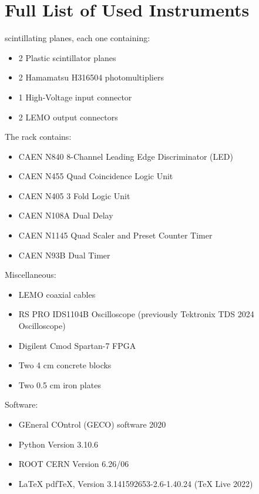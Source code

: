 \documentclass[../main.tex]{subfiles}
\begin{document}
\captionsetup{font=small}
\appendix
{} 

\section{Full List of Used Instruments}
\label{appendix:instruments}
 scintillating planes, each one containing:
\begin{itemize}
    \item 2 Plastic scintillator planes
    \item 2 Hamamatsu H316504 photomultipliers
    \item 1 High-Voltage input connector
    \item 2 LEMO output connectors
\end{itemize}
The rack contains:
\begin{itemize}
    \item CAEN N840 8-Channel Leading Edge Discriminator (LED)
    \item CAEN N455 Quad Coincidence Logic Unit
    \item CAEN N405 3 Fold Logic Unit
    \item CAEN N108A Dual Delay%
    \item CAEN N1145 Quad Scaler and Preset Counter Timer
    \item CAEN N93B Dual Timer
\end{itemize}
Miscellaneous:
\begin{itemize}
    \item LEMO coaxial cables
    \item RS PRO IDS1104B Oscilloscope (previously Tektronix TDS 2024 Oscilloscope)
    \item Digilent Cmod Spartan-7 FPGA
    \item Two 4 cm concrete blocks
    \item Two 0.5 cm iron plates
\end{itemize}
Software:
\begin{itemize}
    \item GEneral COntrol (GECO) software 2020
    \item Python Version 3.10.6
    \item ROOT CERN Version 6.26/06
    \item \LaTeX \phantom{ } pdfTeX, Version 3.141592653-2.6-1.40.24 (\TeX \phantom{}  Live 2022)
\end{itemize}
\end{document}
